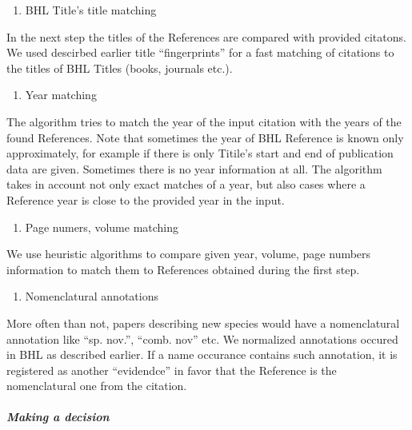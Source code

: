 \documentclass[
]{article}
\providecommand{\tightlist}{%
  \setlength{\itemsep}{0pt}\setlength{\parskip}{0pt}}
\begin{document}
\begin{enumerate}
\def\labelenumi{\arabic{enumi}.}
\setcounter{enumi}{1}
\tightlist
\item
  BHL Title's title matching
\end{enumerate}

In the next step the titles of the References are compared with provided
citatons. We used descirbed earlier title ``fingerprints'' for a fast
matching of citations to the titles of BHL Titles (books, journals
etc.).

\begin{enumerate}
\def\labelenumi{\arabic{enumi}.}
\setcounter{enumi}{2}
\tightlist
\item
  Year matching
\end{enumerate}

The algorithm tries to match the year of the input citation with the
years of the found References. Note that sometimes the year of BHL
Reference is known only approximately, for example if there is only
Titile's start and end of publication data are given. Sometimes there is
no year information at all. The algorithm takes in account not only
exact matches of a year, but also cases where a Reference year is close
to the provided year in the input.

\begin{enumerate}
\def\labelenumi{\arabic{enumi}.}
\setcounter{enumi}{2}
\tightlist
\item
  Page numers, volume matching
\end{enumerate}

We use heuristic algorithms to compare given year, volume, page numbers
information to match them to References obtained during the first step.

\begin{enumerate}
\def\labelenumi{\arabic{enumi}.}
\setcounter{enumi}{3}
\tightlist
\item
  Nomenclatural annotations
\end{enumerate}

More often than not, papers describing new species would have a
nomenclatural annotation like ``sp. nov.'', ``comb. nov'' etc. We
normalized annotations occured in BHL as described earlier. If a name
occurance contains such annotation, it is registered as another
``evidendce'' in favor that the Reference is the nomenclatural one from
the citation.

\hypertarget{making-a-decision}{%
\subparagraph{Making a decision}\label{making-a-decision}}
\end{document}
